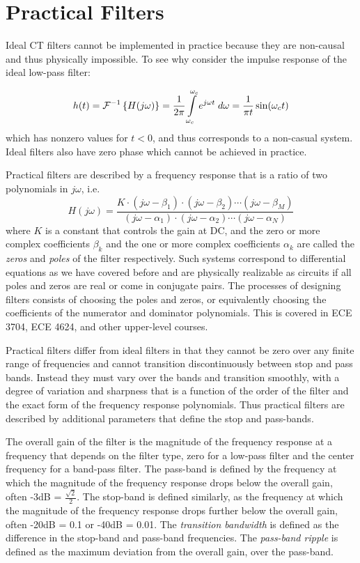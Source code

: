 \section{Practical Filters}

Ideal CT filters cannot be implemented in practice because they are non-causal and thus physically impossible. To see why consider the impulse response of the ideal low-pass filter:

\[
h(t) = \mathcal{F}^{-1} \left\{ H(j\omega) \right\} = \frac{1}{2\pi} \int\limits_{\-\omega_c}^{\omega_c} e^{j\omega t} \; d\omega = \frac{1}{\pi t}\sin(\omega_c t) 
\]
which has nonzero values for $t < 0$, and thus corresponds to a non-casual system. Ideal filters also have zero phase which cannot be achieved in practice.

Practical filters are described by a frequency response that is a ratio of two polynomials in $j\omega$, i.e.
\[
H(j\omega) = \frac{K \cdot(j\omega - \beta_1)\cdot(j\omega - \beta_2)\cdots (j\omega - \beta_M)}{(j\omega - \alpha_1)\cdot(j\omega - \alpha_2)\cdots (j\omega - \alpha_N)}
\]
where $K$ is a constant that controls the gain at DC, and the zero or more complex coefficients $\beta_k$ and the one or more complex coefficients $\alpha_k$ are called the \emph{zeros} and \emph{poles} of the filter respectively. Such systems correspond to differential equations as we have covered before and are physically realizable as circuits if all poles and zeros are real or come in conjugate pairs. The processes of designing filters consists of choosing the poles and zeros, or equivalently choosing the coefficients of the numerator and dominator polynomials. This is covered in ECE 3704, ECE 4624, and other upper-level courses. 

Practical filters differ from ideal filters in that they cannot be zero over any finite range of frequencies and cannot transition discontinuously between stop and pass bands. Instead they must vary over the bands and transition smoothly, with a degree of variation and sharpness that is a function of the order of the filter and the exact form of the frequency response polynomials. Thus practical filters are described by additional parameters that define the stop and pass-bands.

The overall gain of the filter is the magnitude of the frequency response at a frequency that depends on the filter type, zero for a low-pass filter and the center frequency for a band-pass filter. The pass-band is defined by the frequency at which the magnitude of the frequency response drops below the overall gain, often -3dB = $\frac{\sqrt{2}}{2}$. The stop-band is defined similarly, as the frequency at which the magnitude of the frequency response drops further below the overall gain, often -20dB = 0.1 or -40dB = 0.01. The \emph{transition bandwidth} is defined as the difference in the stop-band and pass-band frequencies. The \emph{pass-band ripple} is defined as the maximum deviation from the overall gain, over the pass-band.

